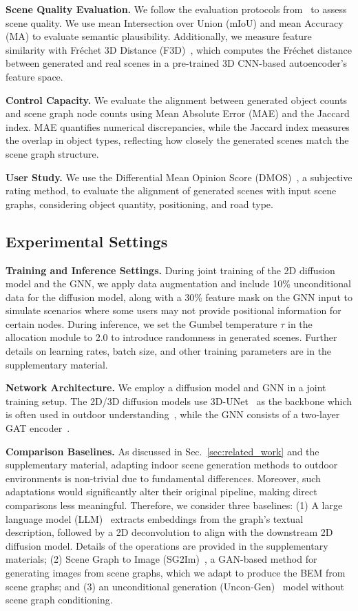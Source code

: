 \noindent \textbf{Scene Quality Evaluation.} 
%
We follow the evaluation protocols from~\cite{pdd} to assess scene quality. We use mean Intersection over Union (mIoU) and mean Accuracy (MA) to evaluate semantic plausibility. Additionally, we measure feature similarity with Fréchet 3D Distance (F3D)~\cite{pdd}, which computes the Fréchet distance between generated and real scenes in a pre-trained 3D CNN-based autoencoder's feature space.


\noindent \textbf{Control Capacity.} 
%
We evaluate the alignment between generated object counts and scene graph node counts using Mean Absolute Error (MAE) and the Jaccard index. MAE quantifies numerical discrepancies, while the Jaccard index measures the overlap in object types, reflecting how closely the generated scenes match the scene graph structure.

\noindent \textbf{User Study.} We use the Differential Mean Opinion Score (DMOS)~\cite{762345}, a subjective rating method, to evaluate the alignment of generated scenes with input scene graphs, considering object quantity, positioning, and road type.

\subsection{Experimental Settings}
\noindent \textbf{Training and Inference Settings.} 
%
During joint training of the 2D diffusion model and the GNN, we apply data augmentation and include 10\% unconditional data for the diffusion model, along with a 30\% feature mask on the GNN input to simulate scenarios where some users may not provide positional information for certain nodes. During inference, we set the Gumbel temperature $\tau$ in the allocation module to 2.0 to introduce randomness in generated scenes.
%
Further details on learning rates, batch size, and other training parameters are in the supplementary material.

\noindent \textbf{Network Architecture.} We employ a diffusion model and GNN in a joint training setup. The 2D/3D diffusion models use 3D-UNet~\cite{3dunet} as the backbone which is often used in outdoor understanding~\cite{li2020campus3d}, while the GNN consists of a two-layer GAT encoder~\cite{gat}. 

\noindent \textbf{Comparison Baselines.} 
%
As discussed in Sec.~\ref{sec:related_work} and the supplementary material, adapting indoor scene generation methods to outdoor environments is non-trivial due to fundamental differences. Moreover, such adaptations would significantly alter their original pipeline, making direct comparisons less meaningful. Therefore, we consider three baselines: (1) A large language model (LLM)~\cite{ye2024language, zhao2023graphtext} extracts embeddings from the graph's textual description, followed by a 2D deconvolution to align with the downstream 2D diffusion model. Details of the operations are provided in the supplementary materials; (2) Scene Graph to Image (SG2Im)~\cite{johnson2018image}, a GAN-based method for generating images from scene graphs, which we adapt to produce the BEM from scene graphs; and (3) an unconditional generation (Uncon-Gen)~\cite{pdd} model without scene graph conditioning.



